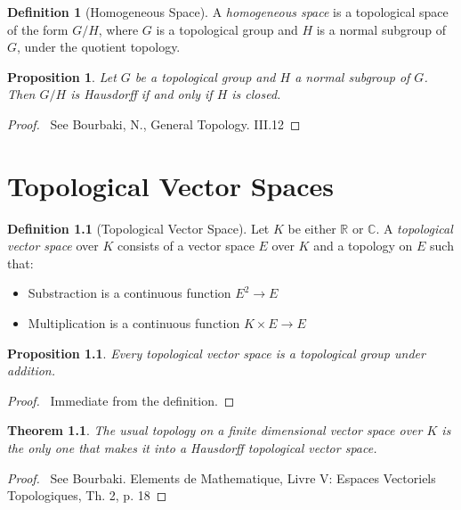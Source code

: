 \documentclass{book}
\let\qed\relax
\newtheorem{prop}[ax]{Proposition}
\newtheorem{thm}[ax]{Theorem}
\theoremstyle{definition}
\newtheorem{df}[ax]{Definition}
\begin{document}
\begin{df}[Homogeneous Space]
A \emph{homogeneous space} is a topological space of the form $G/H$, where $G$ is a topological group and $H$ is a normal subgroup of $G$, under the quotient topology.
\end{df}

\begin{prop}
Let $G$ be a topological group and $H$ a normal subgroup of $G$. Then $G/H$ is Hausdorff if and only if $H$ is closed.
\end{prop}

\begin{proof}
\pf\ See Bourbaki, N., General Topology. III.12 \qed
\end{proof}

\chapter{Topological Vector Spaces}

\begin{df}[Topological Vector Space]
Let $K$ be either $\mathbb{R}$ or $\mathbb{C}$. A \emph{topological vector space} over $K$ consists of a 	vector space $E$ over $K$ and a topology on $E$ such that:
\begin{itemize}
\item Substraction is a continuous function $E^2 \rightarrow E$
\item Multiplication is a continuous function $K \times E \rightarrow E$
\end{itemize}
\end{df}

\begin{prop}
Every topological vector space is a topological group under addition.
\end{prop}

\begin{proof}
\pf\ Immediate from the definition. \qed
\end{proof}

\begin{thm}
The usual topology on a finite dimensional vector space over $K$ is the only one that makes it into a Hausdorff topological vector space.
\end{thm}

\begin{proof}
\pf\ See Bourbaki. Elements de Mathematique, Livre V: Espaces Vectoriels Topologiques, Th. 2, p. 18 \qed
\end{proof}
\end{document}
